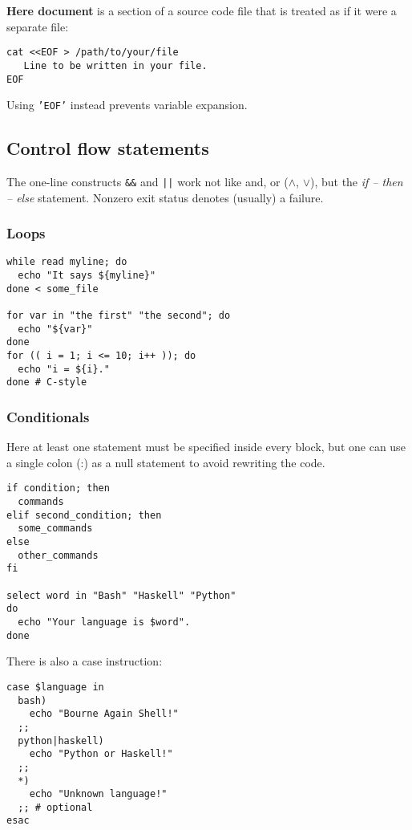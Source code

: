 \textbf{Here document} is a section of a source code file that is treated as if it were a separate file:

\begin{verbatim}
cat <<EOF > /path/to/your/file
   Line to be written in your file.
EOF
\end{verbatim}

Using \texttt{'EOF'} instead prevents variable expansion.

\subsection{Control flow statements}
The one-line constructs \texttt{\&\&} and \texttt{||} work not like and, or ($\wedge$, $\vee$), but the \emph{if -- then -- else} statement.
Nonzero exit status denotes (usually) a failure.

\subsubsection{Loops}
\begin{verbatim}
while read myline; do
  echo "It says ${myline}"
done < some_file

for var in "the first" "the second"; do
  echo "${var}"
done
for (( i = 1; i <= 10; i++ )); do
  echo "i = ${i}."
done # C-style
\end{verbatim}
\subsubsection{Conditionals}
Here at least one statement must be specified inside every block,
but one can use a single colon (:) as a null statement to avoid
rewriting the code.

\begin{verbatim}
if condition; then
  commands
elif second_condition; then
  some_commands
else
  other_commands
fi

select word in "Bash" "Haskell" "Python"
do
  echo "Your language is $word".
done
\end{verbatim}

There is also a case instruction:
\begin{verbatim}
case $language in
  bash)
    echo "Bourne Again Shell!"
  ;;
  python|haskell)
    echo "Python or Haskell!"
  ;;
  *)
    echo "Unknown language!"
  ;; # optional
esac
\end{verbatim}

